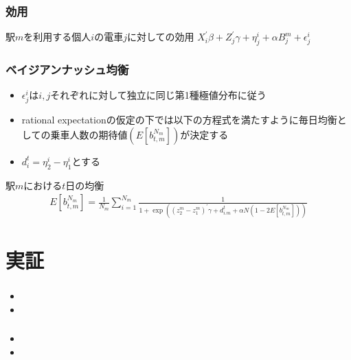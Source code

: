 \documentclass[dvipdfmx, 12pt]{beamer}
\begin{document}
\begin{frame}\frametitle{効用}
	\begin{itembox}[l]{駅$m$を利用する個人$i$の電車$j$に対しての効用}
		$X_i^{'}\beta + Z_j^{'}\gamma + \eta_j^i + \alpha B_j^m + \epsilon_j^i$
	\end{itembox}
\end{frame}

\begin{frame}\frametitle{ベイジアンナッシュ均衡}
	\begin{itemize}
		\item $\epsilon_j^i$は$i, j$それぞれに対して独立に同じ第1種極値分布に従う
		\item rational expectationの仮定の下では以下の方程式を満たすように毎日均衡としての乗車人数の期待値$(E[b_{t,m}^{N_m}])$が決定する
		\item $d_i^t = \eta_2^i - \eta_1^i$とする
	\end{itemize}
	\begin{itembox}[l]{駅$m$における$t$日の均衡}
		\begin{align*}
                	E[b_{t,m}^{N_m}] = \frac{1}{N_m} \sum_{i = 1}^{N_m} \frac{1}{1 + \exp\left( (z_2^m - z_1^m)^{'}\gamma + d_{i.m}^t + \alpha N \left(1 - 2E[b_{t,m}^{N_m}]\right) \right)}
                \end{align*}
	\end{itembox}
\end{frame}

\section{実証}
\begin{frame}\frametitle{}
	\begin{itemize}
		\item 
		\item 
	\end{itemize}
\end{frame}

\begin{frame}\frametitle{}
	\begin{itemize}
		\item 
		\item 
	\end{itemize}
\end{frame}
\end{document}
